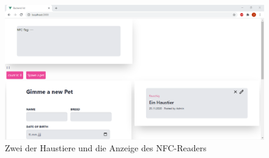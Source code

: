\documentclass[10pt, a4paper]{article}
\begin{document}
\begin{onehalfspace}
\begin{figure}[ht]
  \includegraphics[width=\textwidth]{Haustiere.png}
    \caption{Zwei der Haustiere und die Anzeige des NFC-Readers}
    \label{Haustiere}
\end{figure}


\end{onehalfspace}
\end{document}
